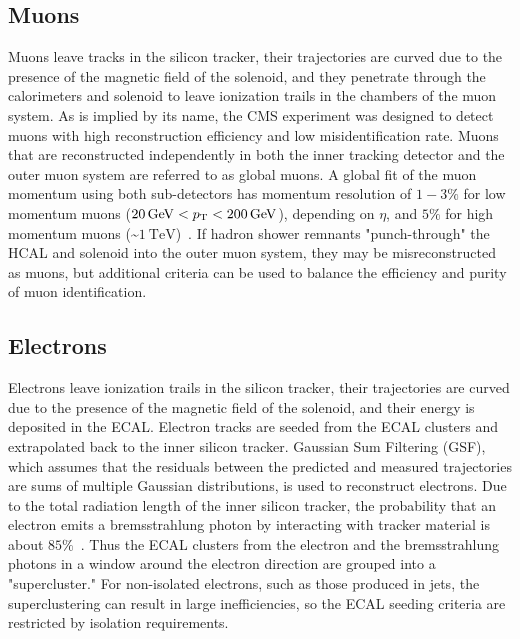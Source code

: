\subsection{Muons}
\label{PF_Reconstruction_Muons}
Muons leave tracks in the silicon tracker, their trajectories are curved due to the presence of the magnetic field of the solenoid, and they penetrate through the calorimeters and solenoid to leave ionization trails in the chambers of the muon system.
As is implied by its name, the CMS experiment was designed to detect muons with high reconstruction efficiency and low misidentification rate.
Muons that are reconstructed independently in both the inner tracking detector and the outer muon system are referred to as global muons.
A global fit of the muon momentum using both sub-detectors has momentum resolution of $1-3\%$ for low momentum muons ($\SI{20}{\GeV} < \pT < \SI{200}{\GeV}$), depending on $\eta$, and $5\%$ for high momentum muons (\sim$\SI{1}{\TeV}$)~\cite{Chatrchyan:1129810}.
If hadron shower remnants "punch-through" the HCAL and solenoid into the outer muon system, they may be misreconstructed as muons, but additional criteria can be used to balance the efficiency and purity of muon identification.

\subsection{Electrons}
\label{PF_Reconstruction_Electrons}
Electrons leave ionization trails in the silicon tracker, their trajectories are curved due to the presence of the magnetic field of the solenoid, and their energy is deposited in the ECAL.
Electron tracks are seeded from the ECAL clusters and extrapolated back to the inner silicon tracker.
Gaussian Sum Filtering (GSF), which assumes that the residuals between the predicted and measured trajectories are sums of multiple Gaussian distributions, is used to reconstruct electrons.
Due to the total radiation length of the inner silicon tracker, the probability that an electron emits a bremsstrahlung photon by interacting with tracker material is about $85\%$~\cite{Sirunyan:2270046}.
Thus the ECAL clusters from the electron and the bremsstrahlung photons in a window around the electron direction are grouped into a "supercluster."
For non-isolated electrons, such as those produced in jets, the superclustering can result in large inefficiencies, so the ECAL seeding criteria are restricted by isolation requirements.

